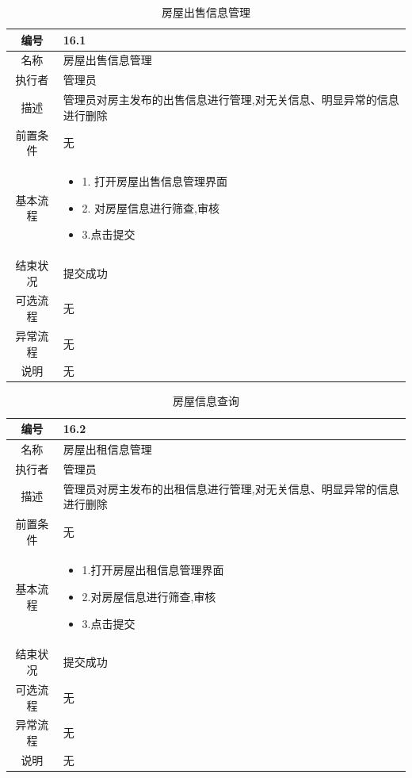 \begin{table}[htbp]
	\centering
	\begin{tabular}{|c|p{11cm}|}
        \hline
        编号 & 16.1 \\
        \hline
        名称 & 房屋出售信息管理 \\ 
        \hline
        执行者 & 管理员 \\
        \hline
        描述 & 管理员对房主发布的出售信息进行管理,对无关信息、明显异常的信息进行删除\\
        \hline
        前置条件 & 无 \\
        \hline
        基本流程 & \begin{itemize}
            \item 1. 打开房屋出售信息管理界面
            \item 2. 对房屋信息进行筛查,审核
            \item 3.点击提交
        \end{itemize} \\
        \hline
        结束状况 & 提交成功 \\
        \hline
        可选流程 & 无 \\
        \hline
        异常流程 & 无 \\
        \hline
        说明 & 无 \\
        \hline
    \end{tabular}
    \caption{房屋出售信息管理}
\end{table}

\begin{table}[htbp]
	\centering
	\begin{tabular}{|c|p{11cm}|}
        \hline
        编号 & 16.2 \\
        \hline
        名称 & 房屋出租信息管理 \\ 
        \hline
        执行者 & 管理员 \\
        \hline
        描述 & 管理员对房主发布的出租信息进行管理,对无关信息、明显异常的信息进行删除     \\
        \hline
        前置条件 & 无 \\
        \hline
        基本流程 & \begin{itemize}
            \item 1.打开房屋出租信息管理界面
            \item 2.对房屋信息进行筛查,审核
            \item 3.点击提交
        \end{itemize} \\
        \hline
        结束状况 & 提交成功 \\
        \hline
        可选流程 & 无 \\
        \hline
        异常流程 & 无 \\
        \hline
        说明 & 无 \\
        \hline
    \end{tabular}
    \caption{房屋信息查询}
\end{table}

